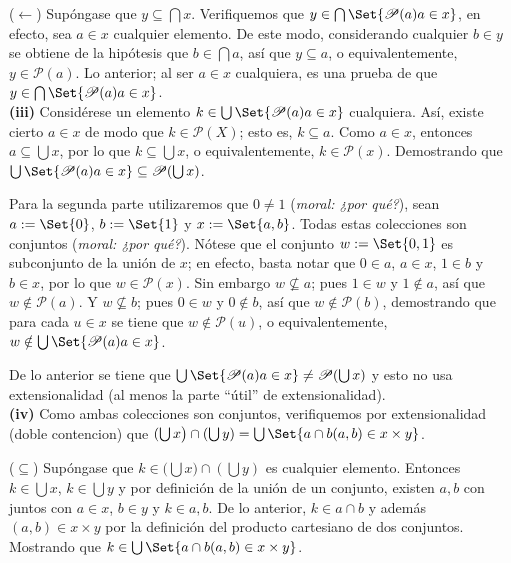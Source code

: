 \documentclass[12pt]{article}
\providecommand\given{}
\newcounter{A}
\begin{document}
    (\(\leftarrow\)) Supóngase que \(y \subseteq \bigcap x\). Verifiquemos que \(y \in \bigcap\Set{\mathscr{P}(a) \given a \in x}\), en efecto, sea \(a \in x\) cualquier elemento. De este modo, considerando cualquier \(b \in y\) se obtiene de la hipótesis que \(b \in \bigcap a\), así que \( y \subseteq a\), o equivalentemente, \(y \in \mathscr{P}(a)\). Lo anterior; al ser \(a \in x\) cualquiera, es una prueba de que \(y \in \bigcap\Set{\mathscr{P}(a) \given a \in x}\).\\

    \textbf{(iii)} Considérese un elemento \( k \in \bigcup \Set{ \mathscr{P}(a) \given a \in x } \) cualquiera. Así, existe cierto \(a \in x\) de modo que \(k \in \mathscr{P}(X)\); esto es, \(k \subseteq a\). Como \(a \in x\), entonces \(a \subseteq \bigcup x\), por lo que \(k \subseteq \bigcup x\), o equivalentemente, \(k \in \mathscr{P}(x)\). Demostrando que \( \bigcup \Set{ \mathscr{P}(a) \given a \in x } \subseteq \mathscr{P}(\bigcup x) \).

    Para la segunda parte utilizaremos que \(0 \neq 1\) (\textit{moral: ¿por qué?}), sean \(a:=\Set{0}\), \(b:=\Set{1}\) y \(x:=\Set{a,b}\). Todas estas colecciones son conjuntos (\textit{moral: ¿por qué?}). Nótese que el conjunto \(w:=\Set{0,1}\) es subconjunto de la unión de \(x\); en efecto, basta notar que \(0 \in a\), \(a \in x\), \(1 \in b\) y \(b \in x\), por lo que \(w \in \mathscr{P}(x)\). Sin embargo \(w \not\subseteq a\); pues \(1 \in w\) y \(1 \notin a\), así que \(w \notin \mathscr{P}(a)\). Y \(w \not\subseteq b\); pues \(0 \in w\) y \(0 \notin b\), así que \(w \notin \mathscr{P}(b)\), demostrando que para cada \(u \in x\) se tiene que \(w \notin \mathscr{P}(u)\), o equivalentemente, \( w \notin \bigcup \Set{ \mathscr{P}(a) \given a \in x } \).

    De lo anterior se tiene que \(\bigcup \Set{ \mathscr{P}(a) \given a \in x } \neq \mathscr{P}(\bigcup x) \) y esto no usa extensionalidad (al menos la parte ``útil'' de extensionalidad). \\

    \textbf{(iv)} Como ambas colecciones son conjuntos, verifiquemos por extensionalidad (doble contencion) que \( ( \bigcup x \big) \cap ( \bigcup y ) = \bigcup \Set{ a \cap b \given (a,b) \in x \times y } \).

    (\(\subseteq\)) Supóngase que \( k \in ( \bigcup x \big) \cap ( \bigcup y ) \) es cualquier elemento. Entonces \(k \in \bigcup x \), \(k \in \bigcup y \) y por definición de la unión de un conjunto, existen \(a,b\) con juntos con \(a \in x\), \(b \in y\) y \(k \in a,b\). De lo anterior, \(k \in a \cap b\) y además \((a,b) \in x \times y\) por la definición del producto cartesiano de dos conjuntos. Mostrando que \(k \in \bigcup \Set{ a \cap b \given (a,b) \in x \times y }\).
\end{document}
